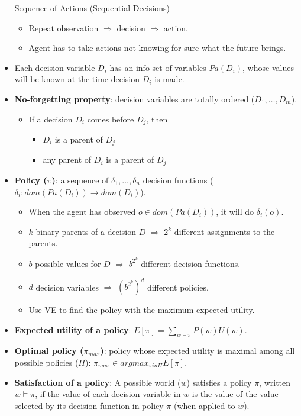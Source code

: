 \documentclass{article}
\begin{document}
\begin{itemize}
\begin{multicols}{2}
            Sequence of Actions (Sequential Decisions)
            \begin{itemize}
                \item Repeat observation $\Rightarrow$ decision $\Rightarrow$ action.
                \item Agent has to take actions not knowing for sure what the future brings.
            \end{itemize}
        \end{multicols}
    \item Each decision variable $D_i$ has an info set of variables $Pa(D_i)$, whose values will be known at the time decision $D_i$ is made.
    \item \textbf{No-forgetting property}: decision variables are totally ordered ($D_1, \ldots, D_m$).
        \begin{itemize}
            \item If a decision $D_i$ comes before $D_j$, then
                \begin{itemize}
                    \item $D_i$ is a parent of $D_j$
                    \item any parent of $D_i$ is a parent of $D_j$
                \end{itemize}
        \end{itemize}
    \item \textbf{Policy ($\pi$)}: a sequence of $\delta_1, \ldots, \delta_n$ decision functions ($\delta_i : dom(Pa(D_i)) \rightarrow dom(D_i)$).
        \begin{itemize}
            \item When the agent has observed $o \in dom(Pa(D_i))$, it will do $\delta_i(o)$.
            \item $k$ binary parents of a decision $D$ $\Rightarrow$ $2^k$ different assignments to the parents.
            \item $b$ possible values for $D$ $\Rightarrow$ $b^{2^k}$ different decision functions.
            \item $d$ decision variables $\Rightarrow$ $(b^{2^k})^d$ different policies.
            \item Use VE to find the policy with the maximum expected utility.
        \end{itemize}
    \item \textbf{Expected utility of a policy}: $E[\pi] = \sum\limits_{w \vDash \pi} P(w)U(w)$.
    \item \textbf{Optimal policy ($\pi_{max}$)}: policy whose expected utility is maximal among all possible policies ($\Pi$): $\pi_{max} \in argmax_{\pi in \Pi} E[\pi]$.
    \item \textbf{Satisfaction of a policy}: A possible world ($w$) satisfies a policy $\pi$, written $w \vDash \pi$, if the value of each decision variable in $w$ is the value of the value selected by its decision function in policy $\pi$ (when applied to $w$).
\end{itemize}
\end{document}
